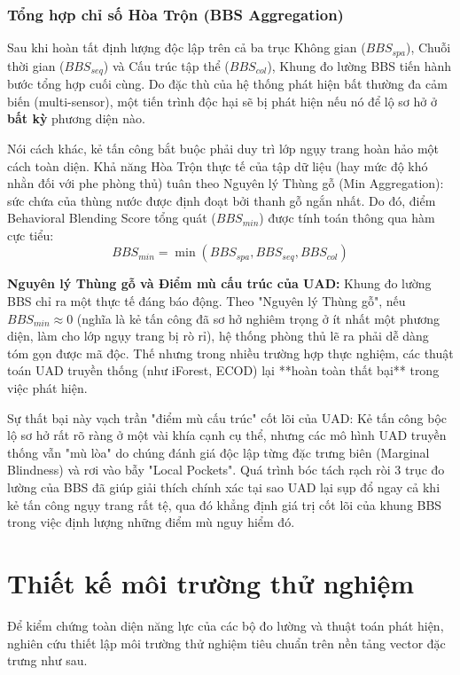 \documentclass[../main.tex]{subfiles}
\begin{document}
\subsubsection{Tổng hợp chỉ số Hòa Trộn (BBS Aggregation)}
Sau khi hoàn tất định lượng độc lập trên cả ba trục Không gian ($BBS_{spa}$), Chuỗi thời gian ($BBS_{seq}$) và Cấu trúc tập thể ($BBS_{col}$), Khung đo lường BBS tiến hành bước tổng hợp cuối cùng. Do đặc thù của hệ thống phát hiện bất thường đa cảm biến (multi-sensor), một tiến trình độc hại sẽ bị phát hiện nếu nó để lộ sơ hở ở \textbf{bất kỳ} phương diện nào.

Nói cách khác, kẻ tấn công bắt buộc phải duy trì lớp ngụy trang hoàn hảo một cách toàn diện. Khả năng Hòa Trộn thực tế của tập dữ liệu (hay mức độ khó nhằn đối với phe phòng thủ) tuân theo Nguyên lý Thùng gỗ (Min Aggregation): sức chứa của thùng nước được định đoạt bởi thanh gỗ ngắn nhất. Do đó, điểm Behavioral Blending Score tổng quát ($BBS_{min}$) được tính toán thông qua hàm cực tiểu:
\begin{equation}
    BBS_{min} = \min(BBS_{spa}, BBS_{seq}, BBS_{col})
\end{equation}

\textbf{Nguyên lý Thùng gỗ và Điểm mù cấu trúc của UAD:} 
Khung đo lường BBS chỉ ra một thực tế đáng báo động. Theo "Nguyên lý Thùng gỗ", nếu $BBS_{min} \approx 0$ (nghĩa là kẻ tấn công đã sơ hở nghiêm trọng ở ít nhất một phương diện, làm cho lớp ngụy trang bị rò rỉ), hệ thống phòng thủ lẽ ra phải dễ dàng tóm gọn được mã độc. Thế nhưng trong nhiều trường hợp thực nghiệm, các thuật toán UAD truyền thống (như iForest, ECOD) lại **hoàn toàn thất bại** trong việc phát hiện.

Sự thất bại này vạch trần "điểm mù cấu trúc" cốt lõi của UAD: Kẻ tấn công bộc lộ sơ hở rất rõ ràng ở một vài khía cạnh cụ thể, nhưng các mô hình UAD truyền thống vẫn "mù lòa" do chúng đánh giá độc lập từng đặc trưng biên (Marginal Blindness) và rơi vào bẫy "Local Pockets". Quá trình bóc tách rạch ròi 3 trục đo lường của BBS đã giúp giải thích chính xác tại sao UAD lại sụp đổ ngay cả khi kẻ tấn công ngụy trang rất tệ, qua đó khẳng định giá trị cốt lõi của khung BBS trong việc định lượng những điểm mù nguy hiểm đó.

\section{Thiết kế môi trường thử nghiệm}
\label{section:2.4}

Để kiểm chứng toàn diện năng lực của các bộ đo lường và thuật toán phát hiện, nghiên cứu thiết lập môi trường thử nghiệm tiêu chuẩn trên nền tảng vector đặc trưng như sau.
\end{document}
